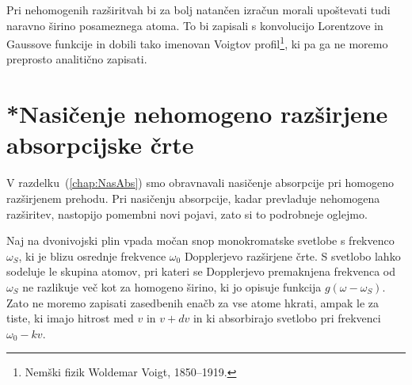 \begin{remark}
Pri nehomogenih razširitvah bi za bolj natančen izračun morali upoštevati 
tudi naravno širino posameznega atoma. To bi zapisali s konvolucijo Lorentzove
in Gaussove funkcije in dobili tako imenovan Voigtov 
profil\footnote{Nemški fizik Woldemar Voigt, 1850--1919.}, ki pa ga ne moremo 
preprosto analitično zapisati.
\end{remark}

\section{*Nasičenje nehomogeno razširjene absorpcijske črte}
V razdelku~(\ref{chap:NasAbs}) smo obravnavali nasičenje absorpcije pri homogeno 
razširjenem prehodu. Pri nasičenju absorpcije, kadar prevladuje nehomogena razširitev,
nastopijo pomembni novi pojavi, zato si to podrobneje oglejmo.

Naj na dvonivojski plin 
vpada močan snop monokromatske svetlobe s frekvenco $\omega_S$,
ki je blizu osrednje frekvence $\omega_{0}$ Dopplerjevo razširjene 
črte. S svetlobo
lahko sodeluje le skupina atomov, pri kateri se Dopplerjevo premaknjena
frekvenca od $\omega_S$ ne razlikuje več kot za homogeno širino, ki
jo opisuje funkcija $g(\omega-\omega_S)$. Zato ne moremo zapisati zasedbenih
enačb za vse atome hkrati, ampak le za tiste, ki imajo hitrost med
$v$ in $v+dv$ in ki absorbirajo svetlobo pri frekvenci $\omega_{0}-kv$.

